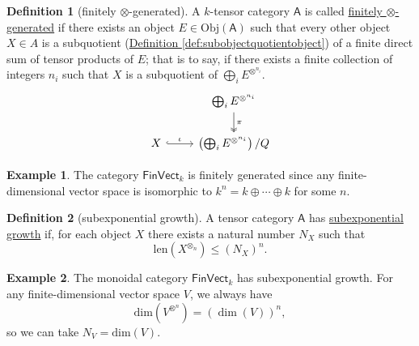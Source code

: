 \documentclass[a4paper]{report}
\newcommand{\defn}[1]{\ul{#1}}
\newcommand{\Obj}{\mathrm{Obj}}
\theoremstyle{definition}
\newtheorem{definition}{Definition}[section]
\newtheorem{example}{Example}[section]
\theoremstyle{plain}
\theoremstyle{remark}
\begin{document}
\begin{definition}[finitely $\otimes$-generated]
  \label{def:finitelygenerated}
  A $k$-tensor category $\mathsf{A}$ is called \defn{finitely $\otimes$-generated} if there exists an object $E \in \Obj(\mathsf{A})$ such that every other object $X \in A$ is a subquotient (\hyperref[def:subobjectquotientobject]{Definition \ref*{def:subobjectquotientobject}}) of a finite direct sum of tensor products of $E$; that is to say, if there exists a finite collection of integers $n_{i}$ such that $X$ is a subquotient of $\bigoplus_{i} E^{\otimes^{n_{i}}}$.
  \begin{equation*}
    \begin{tikzcd}
      & \bigoplus_{i} E^{\otimes^{n_{i}}}
      \arrow[d, twoheadrightarrow, "\pi"]
      \\
      X
      \arrow[r, hookrightarrow, "\iota"]
      & \left( \bigoplus_{i} E^{\otimes^{n_{i}}} \right) / Q
    \end{tikzcd}
  \end{equation*}
\end{definition}

\begin{example}
  The category $\mathsf{FinVect}_{k}$ is finitely generated since any finite-dimensional vector space is isomorphic to $k^{n} = k \oplus \cdots \oplus k$ for some $n$.
\end{example}

\begin{definition}[subexponential growth]
  \label{def:subexponentialgrowth}
  A tensor category $\mathsf{A}$ has \defn{subexponential growth} if, for each object $X$ there exists a natural number $N_{X}$ such that 
  \begin{equation*}
    \mathrm{len}(X^{\otimes_{n}}) \leq (N_{X})^{n}.
  \end{equation*}
\end{definition}

\begin{example}
  The monoidal category $\mathsf{FinVect}_{k}$ has subexponential growth. For any finite-dimensional vector space $V$, we always have 
  \begin{equation*}
    \mathrm{dim}(V^{\otimes^{n}}) = (\dim(V))^{n},
  \end{equation*}
  so we can take $N_{V} = \mathrm{dim}(V)$.
\end{example}
\end{document}
